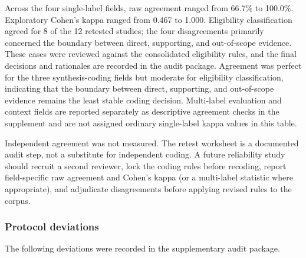 \documentclass[10pt]{article}
\begin{document}
Across the four single-label fields, raw agreement ranged from 66.7\% to 100.0\%. Exploratory Cohen's kappa ranged from 0.467 to 1.000. Eligibility classification agreed for 8 of the 12 retested studies; the four disagreements primarily concerned the boundary between direct, supporting, and out-of-scope evidence. These cases were reviewed against the consolidated eligibility rules, and the final decisions and rationales are recorded in the audit package. Agreement was perfect for the three synthesis-coding fields but moderate for eligibility classification, indicating that the boundary between direct, supporting, and out-of-scope evidence remains the least stable coding decision. Multi-label evaluation and context fields are reported separately as descriptive agreement checks in the supplement and are not assigned ordinary single-label kappa values in this table.

Independent agreement was not measured. The retest worksheet is a documented audit step, not a substitute for independent coding. A future reliability study should recruit a second reviewer, lock the coding rules before recoding, report field-specific raw agreement and Cohen's kappa (or a multi-label statistic where appropriate), and adjudicate disagreements before applying revised rules to the corpus.

\subsubsection{Protocol deviations}

The following deviations were recorded in the supplementary audit package.
\end{document}
